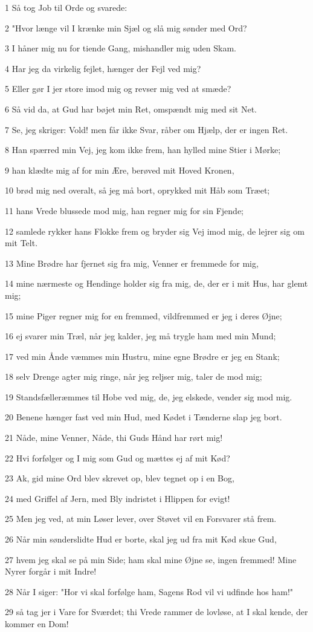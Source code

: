 \par 1 Så tog Job til Orde og svarede:
\par 2 "Hvor længe vil I krænke min Sjæl og slå mig sønder med Ord?
\par 3 I håner mig nu for tiende Gang, mishandler mig uden Skam.
\par 4 Har jeg da virkelig fejlet, hænger der Fejl ved mig?
\par 5 Eller gør I jer store imod mig og revser mig ved at smæde?
\par 6 Så vid da, at Gud har bøjet min Ret, omspændt mig med sit Net.
\par 7 Se, jeg skriger: Vold! men får ikke Svar, råber om Hjælp, der er ingen Ret.
\par 8 Han spærred min Vej, jeg kom ikke frem, han hylled mine Stier i Mørke;
\par 9 han klædte mig af for min Ære, berøved mit Hoved Kronen,
\par 10 brød mig ned overalt, så jeg må bort, oprykked mit Håb som Træet;
\par 11 hans Vrede blussede mod mig, han regner mig for sin Fjende;
\par 12 samlede rykker hans Flokke frem og bryder sig Vej imod mig, de lejrer sig om mit Telt.
\par 13 Mine Brødre har fjernet sig fra mig, Venner er fremmede for mig,
\par 14 mine nærmeste og Hendinge holder sig fra mig, de, der er i mit Hus, har glemt mig;
\par 15 mine Piger regner mig for en fremmed, vildfremmed er jeg i deres Øjne;
\par 16 ej svarer min Træl, når jeg kalder, jeg må trygle ham med min Mund;
\par 17 ved min Ånde væmmes min Hustru, mine egne Brødre er jeg en Stank;
\par 18 selv Drenge agter mig ringe, når jeg reljser mig, taler de mod mig;
\par 19 Standsfælleræmmes til Hobe ved mig, de, jeg elskede, vender sig mod mig.
\par 20 Benene hænger fast ved min Hud, med Kødet i Tænderne slap jeg bort.
\par 21 Nåde, mine Venner, Nåde, thi Guds Hånd har rørt mig!
\par 22 Hvi forfølger og I mig som Gud og mættes ej af mit Kød?
\par 23 Ak, gid mine Ord blev skrevet op, blev tegnet op i en Bog,
\par 24 med Griffel af Jern, med Bly indristet i Hlippen for evigt!
\par 25 Men jeg ved, at min Løser lever, over Støvet vil en Forsvarer stå frem.
\par 26 Når min sønderslidte Hud er borte, skal jeg ud fra mit Kød skue Gud,
\par 27 hvem jeg skal se på min Side; ham skal mine Øjne se, ingen fremmed! Mine Nyrer forgår i mit Indre!
\par 28 Når I siger: "Hor vi skal forfølge ham, Sagens Rod vil vi udfinde hos ham!"
\par 29 så tag jer i Vare for Sværdet; thi Vrede rammer de lovløse, at I skal kende, der kommer en Dom!

